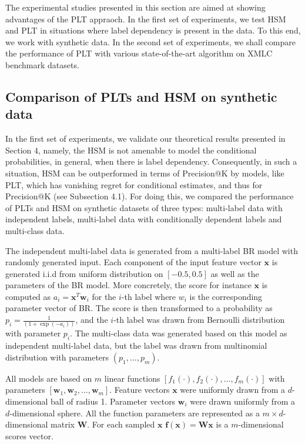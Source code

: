 \documentclass{article}
\newcommand{\Algo}[1]{\textsc{#1}}
\renewcommand{\vec}[1]{\boldsymbol{#1}}
\newcommand{\bx}{\vec{x}}
\newcommand{\bw}{\vec{w}}
\begin{document}
The experimental studies presented in this section are aimed at showing advantages of the PLT appraoch. In the first set of experiments, we test \Algo{HSM} and \Algo{PLT} in situations where label dependency is present in the data. To this end, we work with synthetic data. In the second set of experiments, we shall compare the performance of PLT with various state-of-the-art algorithm on XMLC benchmark datasets.


\subsection{Comparison of PLTs and HSM on synthetic data}
\label{sec:empirical-synthetic}


In the first set of experiments, we validate our theoretical results presented in Section 4, namely, the \Algo{HSM} is not amenable to model the conditional probabilities, in general, when there is label dependency. Consequently, in such a situation, \Algo{HSM} can be outperformed in terms of Precision@K by models, like \Algo{PLT}, which has vanishing regret for conditional estimates, and thus for Precision@K (see Subsection 4.1). For doing this, we compared the performance of PLTs and HSM on synthetic datasets of three types: multi-label data with independent labels, multi-label data with conditionally dependent labels and multi-class data. 

The independent multi-label data is generated from a multi-label BR model with randomly generated input. Each component of the input feature vector $\bx$ is generated i.i.d from uniform distribution on $[-0.5, 0.5]$ as well as the parameters of the BR model. More concretely, the score for instance $\bx$ is computed as $a_i =\bx^{T} \bw_i$ for the $i$-th label where $w_i$ is the corresponding parameter vector of BR. The score is then transformed to a probability as $p_i = \frac{1}{(1 + \exp(-a_i))}$, and the $i$-th label was drawn from Bernoulli distribution with parameter $p_i$. The multi-class data was generated based on this model as independent multi-label data, but the label was drawn from multinomial distribution with parameters $(p_1, \dots , p_m)$.

All models are based on $m$ linear functions $[f_1(\cdot), f_2(\cdot), \ldots, f_m(\cdot)]$ with parameters $[\boldsymbol{w}_1, \boldsymbol{w}_2, \ldots, \boldsymbol{w}_m]$. Feature vectors $\bx$ were uniformly drawn from a $d$-dimensional ball of radius 1. Parameter vectors $\boldsymbol{w}_i$ were drawn uniformly from a $d$-dimensional sphere. All the function parameters are represented as a $m \times d$-dimensional matrix $\boldsymbol{W}$. For each sampled $\bx$ $\boldsymbol{f}(\bx) = \boldsymbol{W}\bx$  is a $m$-dimensional scores vector.
\end{document}
